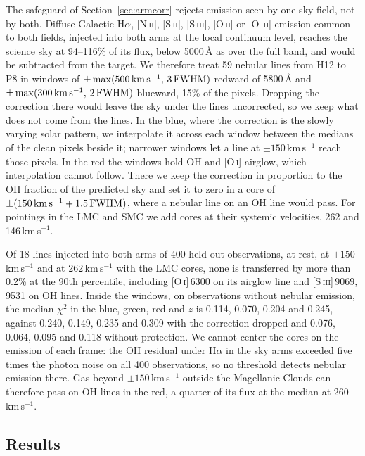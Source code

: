 The safeguard of Section~\ref{sec:armcorr} rejects emission seen by one sky
field, not by both. Diffuse Galactic H$\alpha$, [N\,\textsc{ii}],
[S\,\textsc{ii}], [S\,\textsc{iii}], [O\,\textsc{ii}] or [O\,\textsc{iii}]
emission common to both fields, injected into both arms at the local
continuum level, reaches the science sky at 94--116\% of its flux, below
5000\,\AA{} as over the full band, and would be subtracted from the target.
We therefore treat 59 nebular lines from H12 to P8 in windows of
$\pm\max(500\,{\rm km\,s^{-1}},\,3\,{\rm FWHM})$ redward of 5800\,\AA{} and
$\pm\max(300\,{\rm km\,s^{-1}},\,2\,{\rm FWHM})$ blueward, 15\% of the
pixels. Dropping the correction there would leave the sky under the lines
uncorrected, so we keep what does not come from the lines. In the blue, where
the correction is the slowly varying solar pattern, we interpolate it across
each window between the medians of the clean pixels beside it; narrower
windows let a line at $\pm150$\,km\,s$^{-1}$ reach those pixels. In the red
the windows hold OH and [O\,\textsc{i}] airglow, which interpolation cannot
follow. There we keep the correction in proportion to the OH fraction of the
predicted sky and set it to zero in a core of $\pm(150\,{\rm
km\,s^{-1}}+1.5\,{\rm FWHM})$, where a nebular line on an OH line would
pass. For pointings in the LMC and SMC we add cores at their systemic
velocities, 262 and 146\,km\,s$^{-1}$.

Of 18 lines injected into both arms of 400 held-out observations, at rest,
at $\pm150$\,km\,s$^{-1}$ and at 262\,km\,s$^{-1}$ with the LMC cores, none
is transferred by more than 0.2\% at the 90th percentile, including
[O\,\textsc{i}]\,6300 on its airglow line and [S\,\textsc{iii}]\,9069, 9531
on OH lines. Inside the windows, on observations without nebular emission,
the median $\chi^2$ in the blue, green, red and $z$ is 0.114, 0.070, 0.204
and 0.245, against 0.240, 0.149, 0.235 and 0.309 with the correction dropped
and 0.076, 0.064, 0.095 and 0.118 without protection. We cannot center the
cores on the emission of each frame: the OH residual under H$\alpha$ in the
sky arms exceeded five times the photon noise on all 400 observations, so no
threshold detects nebular emission there. Gas beyond $\pm150$\,km\,s$^{-1}$
outside the Magellanic Clouds can therefore pass on OH lines in the red, a
quarter of its flux at the median at 260\,km\,s$^{-1}$.

\subsection{Results}
\label{sec:cframe-results}

